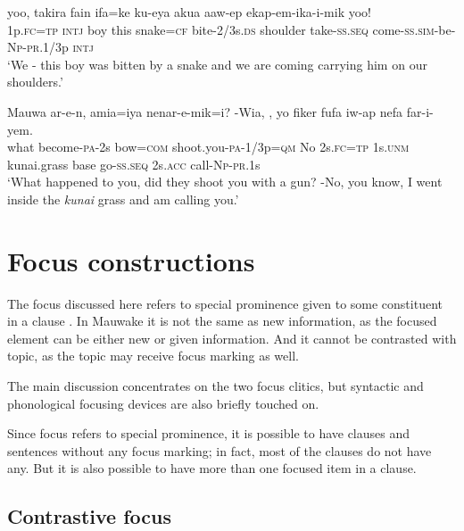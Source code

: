 \ea%
\label{ex:x1686}
\gll {}  yoo,  takira  fain  ifa=ke  ku-eya  akua aaw-ep  ekap-em-ika-i-mik  yoo! \\
1p.\textsc{fc}=\textsc{tp}  \textsc{intj}  boy  this  snake=\textsc{cf}  bite-2/3s.\textsc{ds}  shoulder take-\textsc{ss}.\textsc{seq}  come-\textsc{ss}.\textsc{sim}-be-\textsc{Np}-\textsc{pr}.1/3p  \textsc{intj}     \\
\glt`We - this boy was bitten by a snake and we are coming carrying him on our shoulders.'
\z


\ea%
\label{ex:x1687}
\gll Mauwa  ar-e-n,  amia=iya  nenar-e-mik=i? -Wia,  ,  yo  fiker  fufa  iw-ap  nefa far-i-yem.\\
what  become-\textsc{pa}-2s  bow=\textsc{com}  shoot.you-\textsc{pa}-1/3p=\textsc{qm} No  2s.\textsc{fc}=\textsc{tp}  1s.\textsc{unm}  kunai.grass  base  go-\textsc{ss}.\textsc{seq}  2s.\textsc{acc} call-\textsc{Np}-\textsc{pr}.1s    \\
\glt`What happened to you, did they shoot you with a gun? -No, you know, I went inside the \textit{kunai} grass and am calling you.'
\z


\section{Focus constructions}{\footnotemark}

The focus discussed here refers to special prominence given to some constituent in a clause \citep[174]{Dixon2010a}. In Mauwake it is not the same as new information, as the focused element can be either new or given information. And it cannot be contrasted with topic, as the topic may receive focus marking as well. 

The main discussion concentrates on the two focus clitics, but syntactic and phonological focusing devices are also briefly touched on.

Since focus refers to special prominence, it is possible to have clauses and sentences without any focus marking; in fact, most of the clauses do not have any. But it is also possible to have more than one focused item in a clause. 

\subsection{Contrastive focus}

